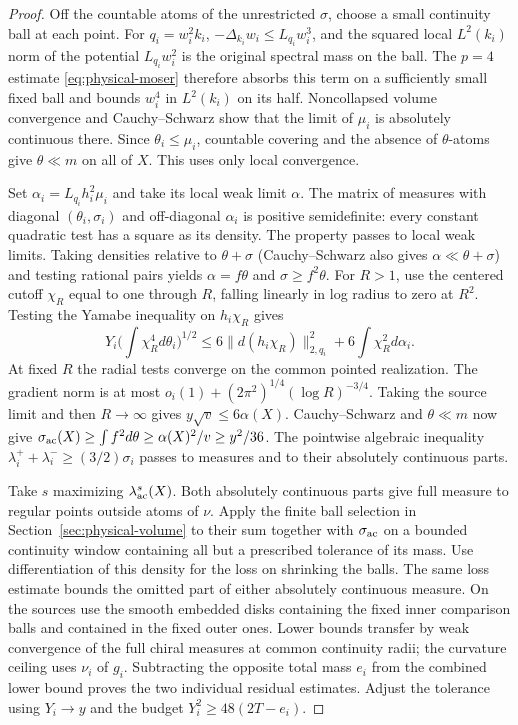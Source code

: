 \begin{proof}
Off the countable atoms of the unrestricted \(\sigma\), choose a
small continuity ball at each point. For \(q_i=w_i^2 k_i\),
\(-\Delta_{k_i}w_i\le L_{q_i}w_i^3\), and the squared local
\(L^2(k_i)\) norm of the potential \(L_{q_i}w_i^2\) is the
original spectral mass on the ball. The \(p=4\) estimate
\eqref{eq:physical-moser} therefore absorbs this term on a sufficiently
small fixed ball and bounds \(w_i^4\) in \(L^2(k_i)\) on its half.
Noncollapsed volume convergence and Cauchy--Schwarz show that the
limit of \(\mu_i\) is absolutely continuous there. Since
\(\theta_i\le\mu_i\), countable covering and the absence of
\(\theta\)-atoms give \(\theta\ll m\) on all of \(X\).
This uses only local convergence.

Set \(\alpha_i=L_{q_i} h_i^2\mu_i\) and take its local weak
limit \(\alpha\). The matrix of measures with diagonal
\((\theta_i,\sigma_i)\) and off-diagonal \(\alpha_i\) is
positive semidefinite: every constant quadratic test has a square
as its density. The property passes to local weak limits. Taking
densities relative to \(\theta+\sigma\) (Cauchy--Schwarz also
gives \(\alpha\ll\theta+\sigma\)) and testing rational pairs yields
\(\alpha=f\theta\) and \(\sigma\ge f^2\theta\).
For \(R>1\), use the centered cutoff \(\chi_R\) equal to one
through \(R\), falling linearly in log radius to zero at \(R^2\).
Testing the Yamabe inequality on \(h_i\chi_R\) gives
\[
 Y_i\Big(\int\chi_R^4d\theta_i\Big)^{1/2}
 \le 6\|d(h_i\chi_R)\|_{2,q_i}^2 +6\int\chi_R^2d\alpha_i .
\]
At fixed \(R\) the radial tests converge on the common pointed
realization. The gradient norm is at most
\(o_i(1)+(2\pi^2)^{1/4}(\log R)^{-3/4}\).
Taking the source limit and then \(R\to\infty\) gives
\(y\sqrt v\le6\alpha(X)\). Cauchy--Schwarz and \(\theta\ll m\)
now give \(\sigma_{\rm ac}(X)\ge\int f^2d\theta
\ge\alpha(X)^2/v\ge y^2/36\). The pointwise algebraic inequality
\(\lambda_i^++\lambda_i^-\ge(3/2)\sigma_i\) passes to measures
and to their absolutely continuous parts.

Take \(s\) maximizing \(\lambda^s_{\rm ac}(X)\).
Both absolutely continuous parts give full measure to regular
points outside atoms of \(\nu\). Apply the finite ball selection
in Section~\ref{sec:physical-volume} to their sum together with
\(\sigma_{\rm ac}\) on a bounded
continuity window containing all but a prescribed tolerance of its
mass. Use differentiation of this density for the loss on shrinking
the balls. The same loss estimate bounds the omitted part of
either absolutely continuous measure. On the sources use the
smooth embedded disks containing the fixed inner comparison balls
and contained in the fixed outer ones. Lower bounds transfer by
weak convergence of the full chiral measures at common continuity
radii; the curvature ceiling uses \(\nu_i\) of \(g_i\).
Subtracting the opposite total mass \(e_i\) from the combined
lower bound proves the two individual residual estimates. Adjust
the tolerance using \(Y_i\to y\) and the budget
\(Y_i^2\ge48(2T-e_i)\).
\end{proof}

